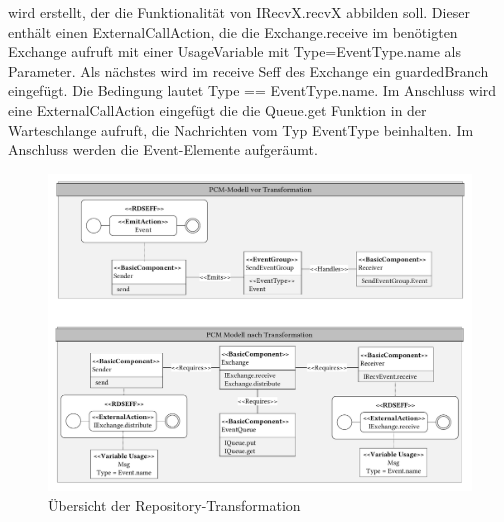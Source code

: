 wird erstellt, der die Funktionalität von IRecvX.recvX abbilden soll. Dieser enthält einen ExternalCallAction, die die Exchange.receive im benötigten Exchange aufruft mit einer UsageVariable mit Type=EventType.name als Parameter. Als nächstes wird im receive Seff des Exchange ein guardedBranch eingefügt. Die Bedingung lautet Type == EventType.name. Im Anschluss wird eine ExternalCallAction eingefügt die die Queue.get Funktion in der Warteschlange aufruft, die Nachrichten vom Typ EventType beinhalten. Im Anschluss werden die Event-Elemente aufgeräumt.

\begin{figure}
\center
  \includegraphics[width=1\textwidth]{images/transformation/transformationRepository.pdf}
  \caption{Übersicht der Repository-Transformation}
  \label{img:transformationRepository}
\end{figure}


